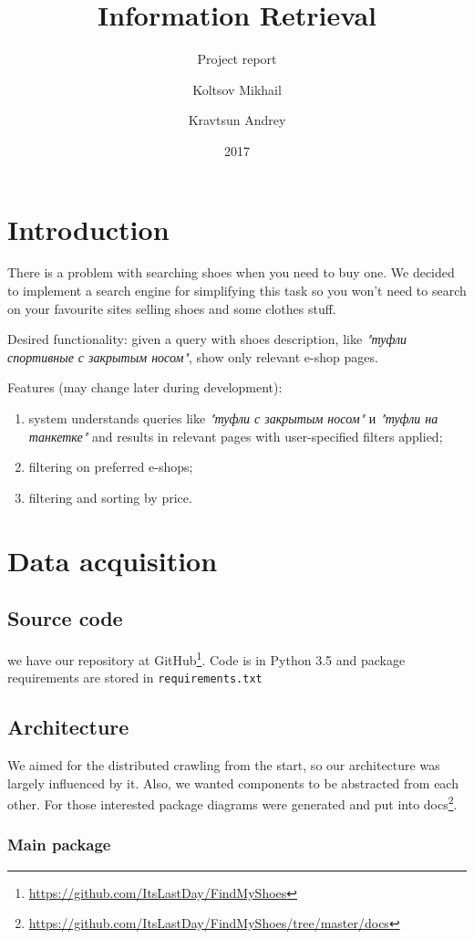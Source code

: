 \documentclass[format=sigconf]{acmart}
\title{Information Retrieval}
\subtitle{Project report}
\author{Koltsov Mikhail}
\author{Kravtsun Andrey}
\date{2017}
\begin{document}
\maketitle

\section{Introduction}
There is a problem with searching shoes when you need to buy one. We decided to implement a search engine for sim\-pli\-fy\-ing this task so you won't need to search on your favourite sites selling shoes and some clothes stuff.

Desired functionality: given a query with shoes description, like \textit{"туфли спортивные с закрытым носом"}, show only re\-le\-vant e-shop pages.

Features (may change later during development):
\begin{enumerate}
    \item system understands queries like \textit{"туфли с закрытым носом"} и \textit{"туфли на танкетке"} and results in relevant pages with user-specified filters applied;
    \item filtering on preferred e-shops;
    \item filtering and sorting by price.
\end{enumerate}

\section{Data acquisition}
\subsection{Source code}
    we have our repository at GitHub\footnote{\url{https://github.com/ItsLastDay/FindMyShoes}}. 
    Code is in Python 3.5 and package requirements are stored in \texttt{requirements.txt}
    
\subsection{Architecture}
    We aimed for the distributed crawling from the start, so our architecture was largely influenced by it. Also, we wanted com\-po\-nents to be abstracted from each other. For those interested package diagrams were generated and put into docs\footnote{\url{https://github.com/ItsLastDay/FindMyShoes/tree/master/docs}}.
    
    \subsubsection{Main package}
\end{document}
